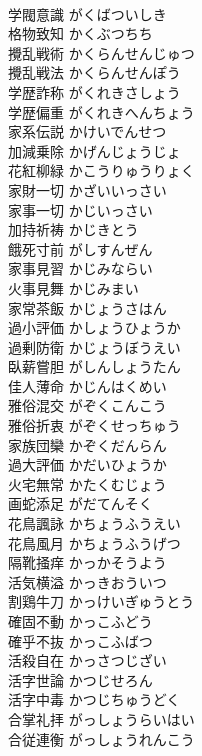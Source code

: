 \documentclass[8pt]{extreport}
\begin{document}
\begin{CJK}{UTF8}{min}
\\	学閥意識	がくばついしき	
\\	格物致知	かくぶつちち	
\\	攪乱戦術	かくらんせんじゅつ	
\\	攪乱戦法	かくらんせんぽう	
\\	学歴詐称	がくれきさしょう	
\\	学歴偏重	がくれきへんちょう	
\\	家系伝説	かけいでんせつ	
\\	加減乗除	かげんじょうじょ	
\\	花紅柳緑	かこうりゅうりょく	
\\	家財一切	かざいいっさい	
\\	家事一切	かじいっさい	
\\	加持祈祷	かじきとう	
\\	餓死寸前	がしすんぜん	
\\	家事見習	かじみならい	
\\	火事見舞	かじみまい	
\\	家常茶飯	かじょうさはん	
\\	過小評価	かしょうひょうか	
\\	過剰防衛	かじょうぼうえい	
\\	臥薪嘗胆	がしんしょうたん	
\\	佳人薄命	かじんはくめい	
\\	雅俗混交	がぞくこんこう	
\\	雅俗折衷	がぞくせっちゅう	
\\	家族団欒	かぞくだんらん	
\\	過大評価	かだいひょうか	
\\	火宅無常	かたくむじょう	
\\	画蛇添足	がだてんそく	
\\	花鳥諷詠	かちょうふうえい	
\\	花鳥風月	かちょうふうげつ	
\\	隔靴掻痒	かっかそうよう	
\\	活気横溢	かっきおういつ	
\\	割鶏牛刀	かっけいぎゅうとう	
\\	確固不動	かっこふどう	
\\	確乎不抜	かっこふばつ	
\\	活殺自在	かっさつじざい	
\\	活字世論	かつじせろん	
\\	活字中毒	かつじちゅうどく	
\\	合掌礼拝	がっしょうらいはい	
\\	合従連衡	がっしょうれんこう	

\end{CJK}
\end{document}
